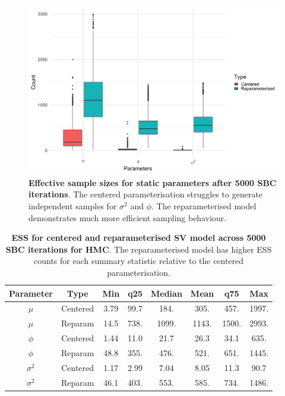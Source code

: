 \documentclass[12pt, a4paper]{article}
\begin{document}
    \begin{figure}[H]
        \centering
        \includegraphics[scale=0.09]{results/hmc_ess.png}
        \caption{\textbf{Effective sample sizes for static parameters after 5000 SBC iterations}. The centered parameterisation struggles to generate independent samples for $\sigma^2$ and $\phi$. The reparameterised model demonstrates much more efficient sampling behaviour.}
        \label{fig:hmcess}
    \end{figure}

    \begin{table}[H]
        \centering
        \begin{tabular}{|c|c|c|c|c|c|c|c|} \hline 
        Parameter &  Type&Min& q25&  Median& Mean & q75&Max\\ \hline 
        $\mu$&  Centered&3.79 & 99.7 & 184. & 305. & 457. & 1997.  \\
     $\mu$&  Reparam&14.5 & 738. & 1099. & 1143. & 1500. & 2993.  \\\hline 
     $\phi$&  Centered&1.44 & 11.0 & 21.7 & 26.3 & 34.1 & 635.  \\
     $\phi$&  Reparam&48.8 & 355. & 476. & 521. & 651. & 1445.   \\ \hline 
     $\sigma^2$&  Centered& 1.17 & 2.99 & 7.04 & 8.05 & 11.3 & 90.7 \\ 
     $\sigma^2$&  Reparam&46.1 & 403. & 553. & 585. & 734. & 1486. \\ \hline
        \end{tabular}
        \caption{\textbf{ESS for centered and reparameterised SV model across 5000 SBC iterations for HMC}. The reparameterised model has higher ESS counts for each summary statistic relative to the centered parameterisation.}
        \label{tab:hmcess}
    \end{table}
\end{document}
